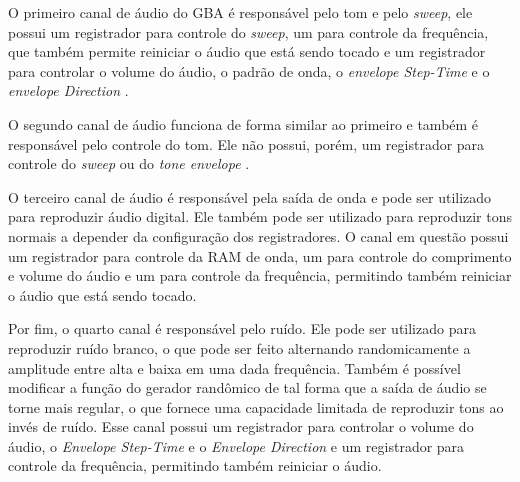 O primeiro canal de áudio do GBA é responsável pelo tom e pelo \textit{sweep}, ele possui um registrador para controle do \textit{sweep}, um para controle da frequência, que também permite reiniciar o áudio que está sendo tocado e um registrador para controlar o volume do áudio, o padrão de onda, o \textit{envelope Step-Time} e o \textit{envelope Direction} \cite{gbatek}.

O segundo canal de áudio funciona de forma similar ao primeiro e também é responsável pelo controle do tom. Ele não possui, porém, um registrador para controle do \textit{sweep} ou do \textit{tone envelope} \cite{gbatek}.

O terceiro canal de áudio é responsável pela saída de onda e pode ser utilizado para reproduzir áudio digital. Ele também pode ser utilizado para reproduzir tons normais a depender da configuração dos registradores. O canal em questão possui um registrador para controle da RAM de onda, um para controle do comprimento e volume do áudio e um para controle da frequência, permitindo também reiniciar o áudio que está sendo tocado.

Por fim, o quarto canal é responsável pelo ruído. Ele pode ser utilizado para reproduzir ruído branco, o que pode ser feito alternando randomicamente a amplitude entre alta e baixa em uma dada frequência. Também é possível modificar a função do gerador randômico de tal forma que a saída de áudio se torne mais regular, o que fornece uma capacidade limitada de reproduzir tons ao invés de ruído. Esse canal possui um registrador para controlar o volume do áudio, o \textit{Envelope Step-Time} e o \textit{Envelope Direction} e um registrador para controle da frequência, permitindo também reiniciar o áudio.
